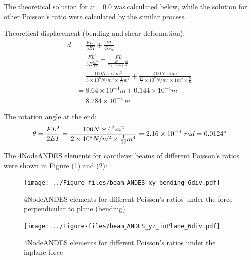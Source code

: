 \documentclass[fleqn,11pt]{article}
\begin{document}
The theoretical solution for $\nu=0.0$ was calculated below, while the solution for other Poisson's ratio were calculated by the similar process.

Theoretical displacement (bending and shear deformation):
\begin{equation}
  \begin{aligned}
  d &=\frac{FL^3}{3EI}+\frac{FL}{GA_v} \\
  &= \frac{FL^3}{3E\frac{bh^3}{12}}+\frac{FL}{\frac{E}{2(1+\nu)} \frac{bh}{\kappa}} \\ 
    &= \frac{100 N \times 6^3 m^3}{3\times 10^8 N/m^2 \times \frac{1}{12} m^4}+ 
    \frac{100 N\times 6 m}{\frac{10}{2} \times 10^7 N/m^2\times 1 m^2 \times \frac{5}{6}} \\ 
    &=8.64\times 10^{-4} m + 0.144 \times 10^{-4} m   \\
   & =8.784\times 10^{-4} \ m
   \end{aligned}
\end{equation}

The rotation angle at the end:
\begin{equation}
  \theta =\frac{FL^2}{2EI} 
   =\frac{100 N \times 6^2 m^2} {2\times 10^8 N/m^2 \times \frac{1}{12} m^4} 
 =2.16 \times 10^{-4} \ rad = 0.0124 \degree 
\end{equation}

The 4NodeANDES elements for cantilever beams of different Poisson's ratios were shown in Figure (\ref{fig 4NodeANDES elements for cantilever beams of different Poisson's ratios}) and (\ref{fig 4NodeANDES elements for cantilever beams of different Poisson's ratios 2}):

\begin{figure}[H]
  \centering
  \texttt{[image: ../Figure-files/beam\_ANDES\_xy\_bending\_6div.pdf]}
  \captionsetup{justification=centering,margin=3cm}
  \caption{4NodeANDES elements for different Poisson's ratios under the force perpendicular to plane (bending)}
  \label{fig 4NodeANDES elements for cantilever beams of different Poisson's ratios}
\end{figure}


\begin{figure}[H]
  \centering
  \texttt{[image: ../Figure-files/beam\_ANDES\_yz\_inPlane\_6div.pdf]}
  \captionsetup{justification=centering,margin=3cm}
  \caption{4NodeANDES elements for different Poisson's ratios under the inplane force}
  \label{fig 4NodeANDES elements for cantilever beams of different Poisson's ratios 2}
\end{figure}
\end{document}
